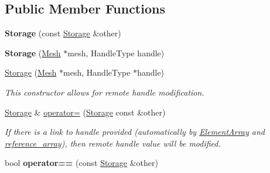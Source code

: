 \subsection*{Public Member Functions}
\begin{DoxyCompactItemize}
\item 
\hypertarget{classINMOST_1_1Storage_adf1bf5a77779751b057db0d2a1d5defc}{{\bfseries Storage} (const \hyperlink{classINMOST_1_1Storage}{Storage} \&other)}\label{classINMOST_1_1Storage_adf1bf5a77779751b057db0d2a1d5defc}

\item 
\hypertarget{classINMOST_1_1Storage_ab54484f34481cbd2583588f7ca502521}{{\bfseries Storage} (\hyperlink{classINMOST_1_1Mesh}{Mesh} $\ast$mesh, Handle\-Type handle)}\label{classINMOST_1_1Storage_ab54484f34481cbd2583588f7ca502521}

\item 
\hypertarget{classINMOST_1_1Storage_a9fd7d01b2f05bf061ba8439fd1d25599}{\hyperlink{classINMOST_1_1Storage_a9fd7d01b2f05bf061ba8439fd1d25599}{Storage} (\hyperlink{classINMOST_1_1Mesh}{Mesh} $\ast$mesh, Handle\-Type $\ast$handle)}\label{classINMOST_1_1Storage_a9fd7d01b2f05bf061ba8439fd1d25599}

\begin{DoxyCompactList}\small\item\em This constructor allows for remote handle modification. \end{DoxyCompactList}\item 
\hypertarget{classINMOST_1_1Storage_a156c939c83d6854e1efaa29c1c38dddb}{\hyperlink{classINMOST_1_1Storage}{Storage} \& \hyperlink{classINMOST_1_1Storage_a156c939c83d6854e1efaa29c1c38dddb}{operator=} (\hyperlink{classINMOST_1_1Storage}{Storage} const \&other)}\label{classINMOST_1_1Storage_a156c939c83d6854e1efaa29c1c38dddb}

\begin{DoxyCompactList}\small\item\em If there is a link to handle provided (automatically by \hyperlink{classINMOST_1_1ElementArray}{Element\-Array} and \hyperlink{classINMOST_1_1Storage_1_1reference__array}{reference\-\_\-array}), then remote handle value will be modified. \end{DoxyCompactList}\item 
\hypertarget{classINMOST_1_1Storage_a2c3431bf6dbdbdfb4beaf2cac0f319a4}{bool {\bfseries operator==} (const \hyperlink{classINMOST_1_1Storage}{Storage} \&other)}\label{classINMOST_1_1Storage_a2c3431bf6dbdbdfb4beaf2cac0f319a4}


\end{DoxyCompactItemize}
